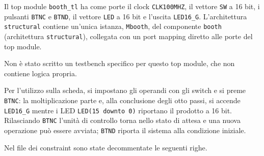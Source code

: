 Il top module \texttt{booth\_tl} ha come porte il clock \texttt{CLK100MHZ}, il vettore \texttt{SW} a 16 bit, i pulsanti \texttt{BTNC} e \texttt{BTND}, il vettore \texttt{LED} a 16 bit e l'uscita \texttt{LED16\_G}. L'architettura \texttt{structural} contiene un'unica istanza, \texttt{Mbooth}, del componente \texttt{booth} (architettura \texttt{structural}), collegata con un port mapping diretto alle porte del top module.


Non è stato scritto un testbench specifico per questo top module, che non contiene logica propria.

\sintesiboard

Per l'utilizzo sulla scheda, si impostano gli operandi con gli switch e si preme \texttt{BTNC}: la moltiplicazione parte e, alla conclusione degli otto passi, si accende \texttt{LED16\_G} mentre i LED \texttt{LED(15 downto 0)} riportano il prodotto a 16 bit. Rilasciando \texttt{BTNC} l'unità di controllo torna nello stato di attesa e una nuova operazione può essere avviata; \texttt{BTND} riporta il sistema alla condizione iniziale. %

Nel file dei constraint sono state decommentate le seguenti righe.

